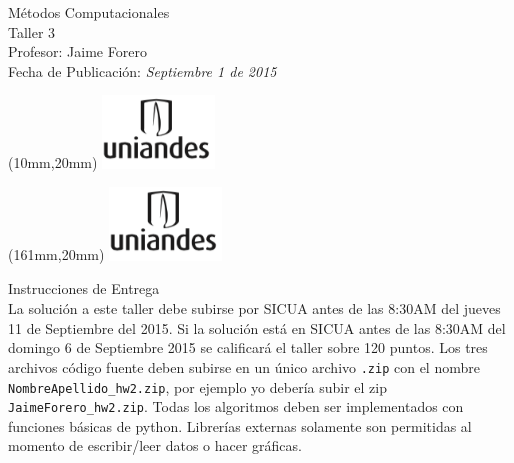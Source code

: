 \documentclass[11pt,letterpaper]{exam}
\begin{document}
\begin{center}
{\Large Métodos Computacionales} \\
Taller 3 \\
Profesor: Jaime Forero\\
Fecha de Publicación: {\small \it Septiembre 1 de 2015}\\
\end{center}

\begin{textblock*}{40mm}(10mm,20mm)
  \includegraphics[width=3cm]{logoUniandes.png}
\end{textblock*}

\begin{textblock*}{40mm}(161mm,20mm)
  \includegraphics[width=3cm]{logoUniandes.png}
\end{textblock*}

\vspace{0.5cm}

{\Large Instrucciones de Entrega}\\

\noindent
La solución a este taller debe subirse por SICUA antes de las 8:30AM
del jueves 11 de Septiembre del 2015. 
\noindent
Si la soluci\'on est\'a en SICUA
antes de las 8:30AM del domingo 6 de Septiembre 2015 se calificar\'a
el taller sobre 120 puntos. 
\noindent
Los tres archivos c\'odigo fuente deben subirse en un \'unico archivo
\verb".zip" con el nombre \verb"NombreApellido_hw2.zip", por ejemplo
yo deber\'ia subir el zip \verb"JaimeForero_hw2.zip".
\noindent
Todas los algoritmos deben ser implementados con funciones b\'asicas
de python. Librer\'ias externas solamente son permitidas al momento de
escribir/leer datos o hacer gr\'aficas.
\end{document}
